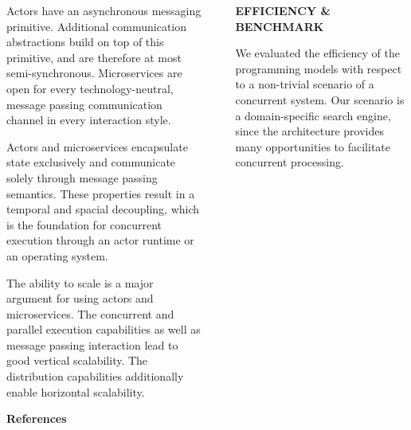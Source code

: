 \documentclass[final,hyperref={pdfpagelabels=true}]{beamer}
\begin{document}
\begin{frame}
\begin{columns}[t]
\begin{column}{.43\textwidth}
{\begin{description}
          \vspace*{1.5\baselineskip}

          \item[\textbf{\textsf{Communication}}] 
          \begin{justify}
          Actors have an asynchronous messaging primitive. Additional
          communication abstractions build on top of this primitive, and are
          therefore at most semi-synchronous. Microservices are open for every
          technology-neutral, message passing communication channel in every
          interaction style.
          \end{justify}

          \vspace*{1.5\baselineskip}

          \item[\textbf{\textsf{Concurrent Execution}}] 
          \begin{justify}
          Actors and microservices encapsulate state exclusively and communicate
          solely through message passing semantics. These properties result in a
          temporal and spacial decoupling, which is the foundation for
          concurrent execution through an actor runtime or an operating system.
          \end{justify}

          \vspace*{1.5\baselineskip}

          \item[\textbf{\textsf{Scalability}}] 
          \begin{justify}
          The ability to scale is a major argument for using actors and
          microservices. The concurrent and parallel execution capabilities as
          well as message passing interaction lead to good vertical scalability.
          The distribution capabilities additionally enable horizontal
          scalability.
          \end{justify}
        \end{description}
        
        \vspace*{1\baselineskip}
        {\scriptsize\textbf{\textsf{References}}}
      }
    \end{column}
    \begin{column}{.06\textwidth}
      \end{column}
    \begin{column}{.43\textwidth}
      \textsf{\textbf{EFFICIENCY \& BENCHMARK}} \\
      \vspace*{.5\baselineskip}
      {\lmodern
        \begin{justify}
        We evaluated the efficiency of the programming models with respect to a
        non-trivial scenario of a concurrent system. Our scenario is a
        domain-specific search engine, since the architecture provides many
        opportunities to facilitate concurrent processing. 


\end{justify}}
\end{column}
\end{columns}
\end{frame}
\end{document}
